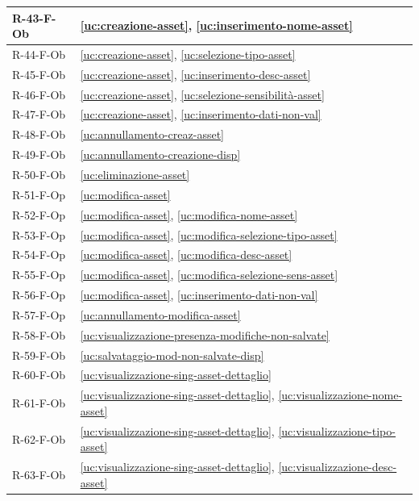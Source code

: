 ﻿\documentclass[a4paper,12pt]{article}
\begin{document}
{\begin{longtable}{|
      >{\centering\arraybackslash}p{}|
      >{\centering\arraybackslash}p{}|
      }
        R-43-F-Ob & \ref{uc:creazione-asset}, \ref{uc:inserimento-nome-asset} \\ \hline
        R-44-F-Ob & \ref{uc:creazione-asset}, \ref{uc:selezione-tipo-asset} \\ \hline
        R-45-F-Ob & \ref{uc:creazione-asset}, \ref{uc:inserimento-desc-asset} \\ \hline
        R-46-F-Ob & \ref{uc:creazione-asset}, \ref{uc:selezione-sensibilità-asset} \\ \hline
        R-47-F-Ob & \ref{uc:creazione-asset}, \ref{uc:inserimento-dati-non-val} \\ \hline
        R-48-F-Ob & \ref{uc:annullamento-creaz-asset} \\ \hline
        R-49-F-Ob & \ref{uc:annullamento-creazione-disp} \\ \hline
        R-50-F-Ob & \ref{uc:eliminazione-asset} \\ \hline
        R-51-F-Op & \ref{uc:modifica-asset} \\ \hline
        R-52-F-Op & \ref{uc:modifica-asset}, \ref{uc:modifica-nome-asset} \\ \hline
        R-53-F-Op & \ref{uc:modifica-asset}, \ref{uc:modifica-selezione-tipo-asset} \\ \hline
        R-54-F-Op & \ref{uc:modifica-asset}, \ref{uc:modifica-desc-asset} \\ \hline
        R-55-F-Op & \ref{uc:modifica-asset}, \ref{uc:modifica-selezione-sens-asset} \\ \hline
        R-56-F-Op & \ref{uc:modifica-asset}, \ref{uc:inserimento-dati-non-val} \\ \hline
        R-57-F-Op & \ref{uc:annullamento-modifica-asset} \\ \hline
        R-58-F-Ob & \ref{uc:visualizzazione-presenza-modifiche-non-salvate} \\ \hline
        R-59-F-Ob & \ref{uc:salvataggio-mod-non-salvate-disp} \\ \hline
        R-60-F-Ob & \ref{uc:visualizzazione-sing-asset-dettaglio} \\ \hline
        R-61-F-Ob & \ref{uc:visualizzazione-sing-asset-dettaglio}, \ref{uc:visualizzazione-nome-asset} \\ \hline
        R-62-F-Ob & \ref{uc:visualizzazione-sing-asset-dettaglio}, \ref{uc:visualizzazione-tipo-asset} \\ \hline
        R-63-F-Ob & \ref{uc:visualizzazione-sing-asset-dettaglio}, \ref{uc:visualizzazione-desc-asset} \\ \hline

\end{longtable}}
\end{document}
